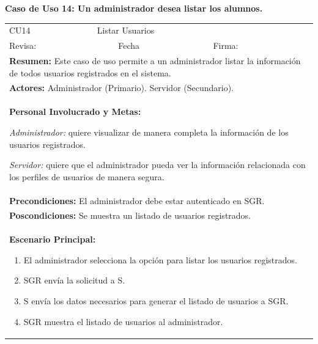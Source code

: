 		\textbf{Caso de Uso 14: Un administrador desea listar los alumnos.}
			\begin{longtable}{|l|p{5.5cm}|l|p{2cm}|l|p{1.9cm}|} \hline
					\cellcolor{grisOscuro} CU14 & \multicolumn{4}{|l|}{  \cellcolor{grisOscuro} Listar Usuarios} &  \cellcolor{grisClaro}\multirow{2}{1cm}{} \\ \cline{1-5}
					\cellcolor{grisOscuro} Revisa: &  \cellcolor{grisClaro} &  \cellcolor{grisOscuro} Fecha &  \cellcolor{grisClaro} &  \cellcolor{grisOscuro} Firma: & \cellcolor{grisClaro} \\ \hline
					\multicolumn{6}{|p{15cm}|}{ \textbf{Resumen: } Este caso de uso permite a un administrador listar la información de todos usuarios registrados en el sistema.

					} \\ \hline

					\multicolumn{6}{|p{15cm}|}{ \textbf{Actores: } Administrador (Primario). Servidor (Secundario).

					} \\ \hline

					\multicolumn{6}{|p{15cm}|}{ \textbf{Personal Involucrado y Metas: }

					\emph{Administrador:} quiere visualizar de manera completa la información de los usuarios registrados.

					\emph{Servidor:} quiere que el administrador pueda ver la información relacionada con los perfiles de usuarios de manera segura.

					} \\ \hline

					\multicolumn{6}{|p{15cm}|}{ \textbf{Precondiciones: } El administrador debe estar autenticado en SGR.

					} \\ \hline

					\multicolumn{6}{|p{15cm}|}{ \textbf{Poscondiciones: } Se muestra un listado de usuarios registrados.

					} \\ \hline

					\multicolumn{6}{|p{15cm}|}{ \textbf{Escenario Principal: }

					\begin{enumerate}
							\item El administrador selecciona la opción para listar los usuarios registrados.
							\item SGR envía la solicitud a S.
							\item S envía los datos necesarios para generar el listado de usuarios a SGR.
							\item SGR muestra el listado de usuarios al administrador.
					\end{enumerate}

}
\end{longtable}
